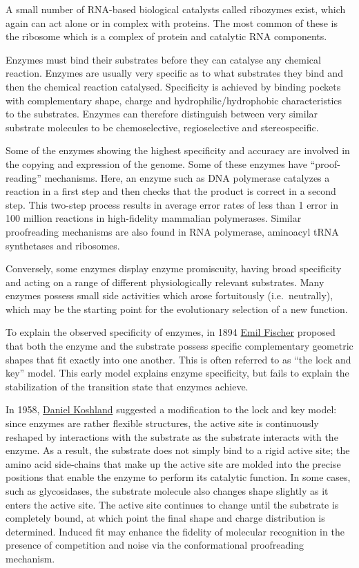 A small number of RNA-based biological catalysts called ribozymes exist, which again can act alone or in complex with proteins. The most common of these is the ribosome which is a complex of protein and catalytic RNA components.

Enzymes must bind their substrates before they can catalyse any chemical reaction. Enzymes are usually very specific as to what substrates they bind and then the chemical reaction catalysed. Specificity is achieved by binding pockets with complementary shape, charge and hydrophilic/hydrophobic characteristics to the substrates. Enzymes can therefore distinguish between very similar substrate molecules to be chemoselective, regioselective and stereospecific.

Some of the enzymes showing the highest specificity and accuracy are involved in the copying and expression of the genome. Some of these enzymes have ``proof-reading'' mechanisms. Here, an enzyme such as DNA polymerase catalyzes a reaction in a first step and then checks that the product is correct in a second step. This two-step process results in average error rates of less than 1 error in 100 million reactions in high-fidelity mammalian polymerases. Similar proofreading mechanisms are also found in RNA polymerase, aminoacyl tRNA synthetases and ribosomes.

Conversely, some enzymes display enzyme promiscuity, having broad specificity and acting on a range of different physiologically relevant substrates. Many enzymes possess small side activities which arose fortuitously (i.e.~neutrally), which may be the starting point for the evolutionary selection of a new function.

To explain the observed specificity of enzymes, in 1894 \href{https://en.wikipedia.org/wiki/Emil_Fischer}{Emil Fischer} proposed that both the enzyme and the substrate possess specific complementary geometric shapes that fit exactly into one another. This is often referred to as ``the lock and key'' model. This early model explains enzyme specificity, but fails to explain the stabilization of the transition state that enzymes achieve.

In 1958, \href{https://en.wikipedia.org/wiki/Daniel_E._Koshland_Jr.}{Daniel Koshland} suggested a modification to the lock and key model: since enzymes are rather flexible structures, the active site is continuously reshaped by interactions with the substrate as the substrate interacts with the enzyme. As a result, the substrate does not simply bind to a rigid active site; the amino acid side-chains that make up the active site are molded into the precise positions that enable the enzyme to perform its catalytic function. In some cases, such as glycosidases, the substrate molecule also changes shape slightly as it enters the active site. The active site continues to change until the substrate is completely bound, at which point the final shape and charge distribution is determined. Induced fit may enhance the fidelity of molecular recognition in the presence of competition and noise via the conformational proofreading mechanism.

